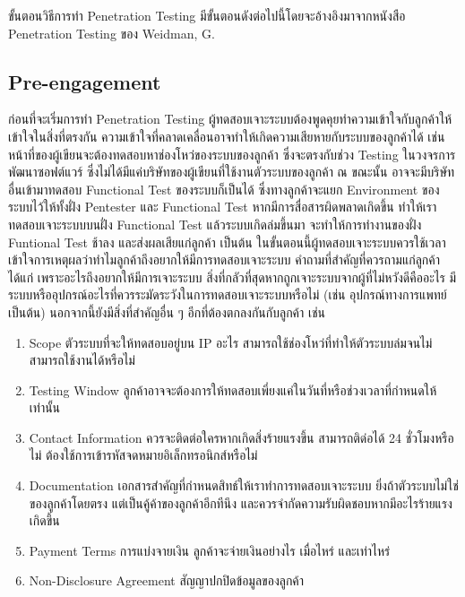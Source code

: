 ขั้นตอนวิธีการทำ Penetration Testing มีขั้นตอนดังต่อไปนี้โดยจะอ้างอิงมาจากหนังสือ Penetration Testing ของ Weidman, G. \cite{weidman2014penetration}

\subsection{Pre-engagement}

ก่อนที่จะเริ่มการทำ Penetration Testing ผู้ทดสอบเจาะระบบต้องพูดคุยทำความเข้าใจกับลูกค้าให้เข้าใจในสิ่งที่ตรงกัน ความเข้าใจที่คลาดเคลื่อนอาจทำให้เกิดความเสียหายกับระบบของลูกค้าได้ เช่น หน้าที่ของผู้เขียนจะต้องทดสอบหาช่องโหว่ของระบบของลูกค้า ซึ่งจะตรงกับช่วง Testing ในวงจรการพัฒนาซอฟต์แวร์ ซึ่งไม่ได้มีแค่บริษัทของผู้เขียนที่ใช้งานตัวระบบของลูกค้า ณ ขณะนั้น อาจจะมีบริษัทอื่นเข้ามาทดสอบ Functional Test ของระบบก็เป็นได้ ซึ่งทางลูกค้าจะแยก Environment ของระบบไว้ให้ทั้งฝั่ง Pentester และ Functional Test หากมีการสื่อสารผิดพลาดเกิดขึ้น ทำให้เราทดสอบเจาะระบบบนฝั่ง Functional Test แล้วระบบเกิดล่มขึ้นมา จะทำให้การทำงานของฝั่ง Funtional Test ช้าลง และส่งผลเสียแก่ลูกค้า เป็นต้น
ในขั้นตอนนี้ผู้ทดสอบเจาะระบบควรใช้เวลาเข้าใจการเหตุผลว่าทำไมลูกค้าถึงอยากให้มีการทดสอบเจาะระบบ คำถามที่สำคัญที่ควรถามแก่ลูกค้าได้แก่ เพราะอะไรถึงอยากให้มีการเจาะระบบ สิ่งที่กลัวที่สุดหากถูกเจาะระบบจากผู้ที่ไม่หวังดีคืออะไร มีระบบหรืออุปกรณ์อะไรที่ควรระมัดระวังในการทดสอบเจาะระบบหรือไม่ (เช่น อุปกรณ์ทางการแพทย์ เป็นต้น)
นอกจากนี้ยังมีสิ่งที่สำคัญอื่น ๆ อีกที่ต้องตกลงกันกับลูกค้า เช่น

\begin{enumerate}
	\itemsep0em 
	\item Scope ตัวระบบที่จะให้ทดสอบอยู่บน IP อะไร สามารถใช้ช่องโหว่ที่ทำให้ตัวระบบล่มจนไม่สามารถใช้งานได้หรือไม่ 
	\item Testing Window ลูกค้าอาจจะต้องการให้ทดสอบเพี่ยงแค่ในวันที่หรือช่วงเวลาที่กำหนดให้เท่านั้น
	\item Contact Information ควรจะติดต่อใครหากเกิดสิ่งร้ายแรงขึ้น สามารถติด่อได้ 24 ชั่วโมงหรือไม่ ต้องใช้การเข้ารหัสจดหมายอิเล็กทรอนิกส์หรือไม่
	\item Documentation เอกสารสำคัญที่กำหนดสิทธ์ให้เราทำการทดสอบเจาะระบบ ยิ่งถ้าตัวระบบไม่ใช่ของลูกค้าโดยตรง แต่เป็นคู้ค้าของลูกค้าอีกทีนึง และควรจำกัดความรับผิดชอบหากมีอะไรร้ายแรงเกิดขึ้น
	\item Payment Terms การแบ่งจายเงิน ลูกค้าจะจ่ายเงินอย่างไร เมื่อไหร่ และเท่าไหร่
	\item Non-Disclosure Agreement สัญญาปกปิดข้อมูลของลูกค้า
\end{enumerate}

